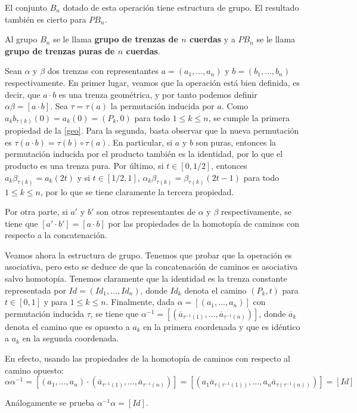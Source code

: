 \documentclass[bibtex, anon]{TEMat-article}
\begin{document}
\begin{proposicion}
	El conjunto $B_n$ dotado de esta operación tiene estructura de grupo. El resultado también es cierto para $PB_n$. 
\end{proposicion}
Al grupo $B_n$ se le llama \textbf{grupo de trenzas de $n$ cuerdas} y a $PB_n$ se le llama \textbf{grupo de trenzas puras de $n$ cuerdas}. 
\begin{demostracion}
	Sean $\alpha$ y $\beta$ dos trenzas con representantes $a=(a_1,\dots, a_n)$ y $b=(b_1,\dots, b_n)$ respectivamente. En primer lugar, veamos que la operación está bien definida, es decir, que $a\cdot b$ es una trenza geométrica, y por tanto podemos definir $\alpha\beta=[a\cdot b]$. Sea $\tau=\tau(a)$ la permutación inducida por $a$. Como $a_kb_{\tau(k)}(0)=a_k(0)=(P_k,0)$ para todo $1\leq k\leq n$, se cumple la primera propiedad de la \cref{geo}. Para la segunda, basta observar que la nueva permutación es $\tau(a\cdot b)=\tau(b)\circ \tau(a)$. En particular, si $a$ y $b$ son puras, entonces la permutación inducida por el producto también es la identidad, por lo que el producto es una trenza pura. Por último, si $t\in[0,1/2]$, entonces $a_k\beta_{\tau(k)}=a_k(2t)$ y si $t\in [1/2,1]$, $\alpha_k\beta_{\tau(k)}=\beta_{\tau(k)}(2t-1)$ para todo $1\leq k\leq n$, por lo que se tiene claramente la tercera propiedad. 
	
	Por otra parte, si $a'$ y $b'$ son otros representantes de $\alpha$ y $\beta$ respectivamente, se tiene que $[a'\cdot b']=[a\cdot b]$ por las propiedades de la homotopía de caminos con respecto a la concatenación.
	
	Veamos ahora la estructura de grupo. Tenemos que probar que la operación es asociativa, pero esto se deduce de que la concatenación de caminos es asociativa salvo homotopía.
	Tenemos claramente que la identidad es la trenza constante representada por $Id=(Id_1,\dots, Id_n)$, donde $Id_k$ denota el camino $(P_k, t)$ para $t\in[0,1]$ y para $1\leq k\leq n$.
	Finalmente, dada $\alpha=[(a_1,\dots, a_n)]$ con permutación inducida $\tau$, se tiene que $\alpha^{-1}=[(\overline{a}_{\tau^{-1}(1)},\dots, \overline{a}_{\tau^{-1}(n)})]$, donde $\overline{a}_k$ denota el camino que es opuesto a $a_k$ en la primera coordenada y que es idéntico a $a_k$ en la segunda coordenada. 
	
	En efecto, usando las propiedades de la homotopía de caminos con respecto al camino opuesto:
	\[
	\alpha\alpha^{-1}=[(a_1,\dots, a_n)\cdot (\overline{a}_{\tau^{-1}(1)},\dots, \overline{a}_{\tau^{-1}(n)})]=[(a_1\overline{a}_{\tau(\tau^{-1}(1))},\dots, a_n\overline{a}_{\tau(\tau^{-1}(n))})]=[Id]
	\]
	
	Análogamente se prueba $\alpha^{-1}\alpha=[Id]$. 
	
\end{demostracion}
\end{document}
